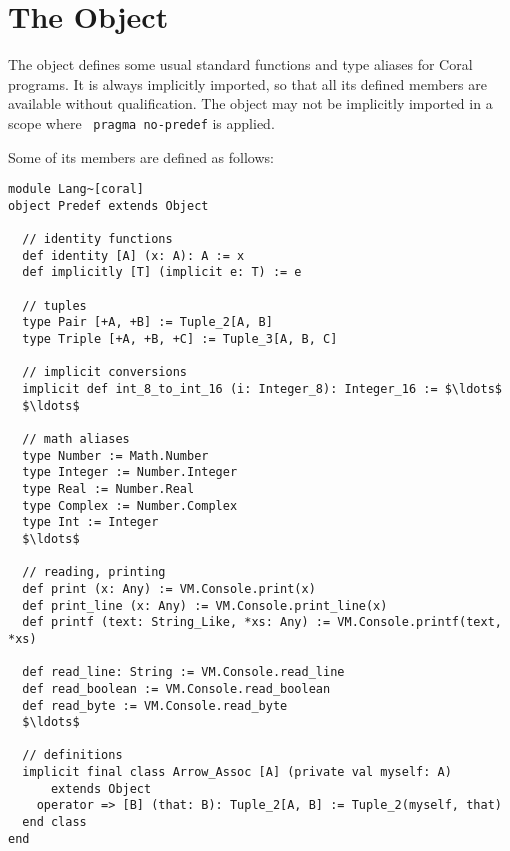 \section{The  Object}
\label{sec:predef}

The  object defines some usual standard functions and type aliases for Coral programs. It is always implicitly imported, so that all its defined members are available without qualification. The  object may not be implicitly imported in a scope where ~\lstinline!pragma no-predef! is applied. 

Some of its members are defined as follows:

\begin{minipage}{\linewidth}
\begin{lstlisting}
module Lang~[coral]
object Predef extends Object

  // identity functions
  def identity [A] (x: A): A := x
  def implicitly [T] (implicit e: T) := e

  // tuples
  type Pair [+A, +B] := Tuple_2[A, B]
  type Triple [+A, +B, +C] := Tuple_3[A, B, C]

  // implicit conversions
  implicit def int_8_to_int_16 (i: Integer_8): Integer_16 := $\ldots$
  $\ldots$

  // math aliases
  type Number := Math.Number
  type Integer := Number.Integer
  type Real := Number.Real
  type Complex := Number.Complex
  type Int := Integer
  $\ldots$
  
  // reading, printing
  def print (x: Any) := VM.Console.print(x)
  def print_line (x: Any) := VM.Console.print_line(x)
  def printf (text: String_Like, *xs: Any) := VM.Console.printf(text, *xs)
  
  def read_line: String := VM.Console.read_line
  def read_boolean := VM.Console.read_boolean
  def read_byte := VM.Console.read_byte
  $\ldots$
  
  // definitions
  implicit final class Arrow_Assoc [A] (private val myself: A)
      extends Object
    operator => [B] (that: B): Tuple_2[A, B] := Tuple_2(myself, that)
  end class
end
\end{lstlisting}
\end{minipage}







